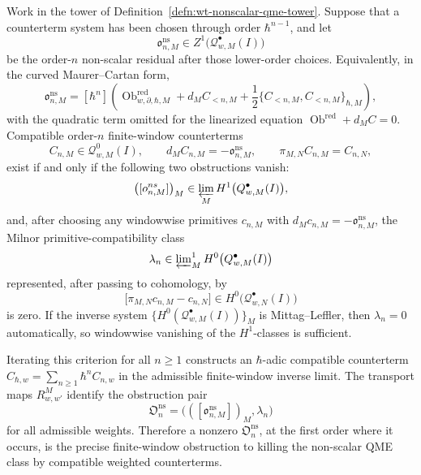 \begin{thm}
\label{thm:wt-nonscalar-counterterm-criterion}
  Work in the tower of
  Definition~\ref{defn:wt-nonscalar-qme-tower}.  Suppose that a
  counterterm system has been chosen through order \(\hbar^{n-1}\), and
  let
  \[
    \mathfrak o^{\mathrm{ns}}_{n,M}
      \in Z^1\bigl(\mathcal Q^\bullet_{w,M}(I)\bigr)
  \]
  be the order-\(n\) non-scalar residual after those lower-order choices.
  Equivalently, in the curved Maurer--Cartan form,
  \[
    \mathfrak o^{\mathrm{ns}}_{n,M}
      =
      [\hbar^n]\left(
        \operatorname{Ob}^{\mathrm{red}}_{w,\partial,\hbar,M}
        +d_MC_{<n,M}
        +\frac12\{C_{<n,M},C_{<n,M}\}_{\hbar,M}
      \right),
  \]
  with the quadratic term omitted for the linearized equation
  \(\operatorname{Ob}^{\mathrm{red}}+d_MC=0\).  Compatible
  order-\(n\) finite-window counterterms
  \[
    C_{n,M}\in\mathcal Q^0_{w,M}(I),\qquad
    d_MC_{n,M}=-\mathfrak o^{\mathrm{ns}}_{n,M},\qquad
    \pi_{M,N}C_{n,M}=C_{n,N},
  \]
  exist if and only if the following two obstructions vanish:
  \[
    \bigl([\mathfrak o^{\mathrm{ns}}_{n,M}]\bigr)_M
      \in
      \varprojlim_M H^1\bigl(\mathcal Q^\bullet_{w,M}(I)\bigr),
  \]
  and, after choosing any windowwise primitives
  \(c_{n,M}\) with \(d_Mc_{n,M}=-\mathfrak o^{\mathrm{ns}}_{n,M}\), the
  Milnor primitive-compatibility class
  \[
    \lambda_n\in
      \varprojlim\nolimits^1_M
      H^0\bigl(\mathcal Q^\bullet_{w,M}(I)\bigr)
  \]
  represented, after passing to cohomology, by
  \[
    \bigl[\pi_{M,N}c_{n,M}-c_{n,N}\bigr]\in
      H^0\bigl(\mathcal Q^\bullet_{w,N}(I)\bigr)
  \]
  is zero.  If the inverse system
  \(\{H^0(\mathcal Q^\bullet_{w,M}(I))\}_M\) is Mittag--Leffler, then
  \(\lambda_n=0\) automatically, so windowwise vanishing of the
  \(H^1\)-classes is sufficient.

  Iterating this criterion for all \(n\geq1\) constructs an
  \(\hbar\)-adic compatible counterterm
  \(C_{\hbar,w}=\sum_{n\geq1}\hbar^n C_{n,w}\) in the admissible
  finite-window inverse limit.  The transport maps \(R^M_{w,w'}\)
  identify the obstruction pair
  \[
    \mathfrak O^{\mathrm{ns}}_n
      =
      \bigl(([\mathfrak o^{\mathrm{ns}}_{n,M}])_M,\lambda_n\bigr)
  \]
  for all admissible weights.  Therefore a nonzero
  \(\mathfrak O^{\mathrm{ns}}_n\), at the first order where it occurs, is
  the precise finite-window obstruction to killing the non-scalar QME
  class by compatible weighted counterterms.
\end{thm}

